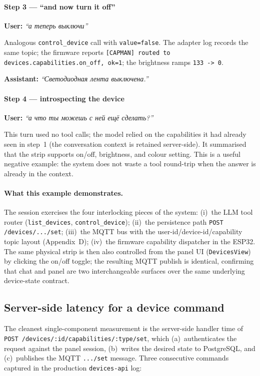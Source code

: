 \documentclass[a4paper,12pt]{article}
\begin{document}
\paragraph{Step 3 --- ``and now turn it off''}
\textbf{User:} \foreignlanguage{russian}{\emph{``а теперь выключи''}}\par
Analogous \verb|control_device| call with \verb|value=false|. The adapter log records the same topic; the firmware reports \verb|[CAPMAN] routed to devices.capabilities.on_off, ok=1|; the brightness ramps \verb|133 -> 0|.\par
\textbf{Assistant:} \foreignlanguage{russian}{\emph{``Светодиодная лента выключена.''}}

\paragraph{Step 4 --- introspecting the device}
\textbf{User:} \foreignlanguage{russian}{\emph{``а что ты можешь с ней ещё сделать?''}}\par
This turn used no tool calls; the model relied on the capabilities it had already seen in step~1 (the conversation context is retained server-side). It summarised that the strip supports on/off, brightness, and colour setting. This is a useful negative example: the system does not waste a tool round-trip when the answer is already in the context.

\paragraph{What this example demonstrates.}
The session exercises the four interlocking pieces of the system: (i)~the LLM tool router (\verb|list_devices|, \verb|control_device|); (ii)~the persistence path \verb|POST /devices/.../set|; (iii)~the MQTT bus with the user-id/device-id/capability topic layout (Appendix~D); (iv)~the firmware capability dispatcher in the ESP32. The same physical strip is then also controlled from the panel UI (\verb|DevicesView|) by clicking the on/off toggle; the resulting MQTT publish is identical, confirming that chat and panel are two interchangeable surfaces over the same underlying device-state contract.

\subsection{Server-side latency for a device command}

The cleanest single-component measurement is the server-side handler time of \verb|POST /devices/:id/capabilities/:type/set|, which (a)~authenticates the request against the panel session, (b)~writes the desired state to PostgreSQL, and (c)~publishes the MQTT \verb|.../set| message. Three consecutive commands captured in the production \verb|devices-api| log:
\end{document}
